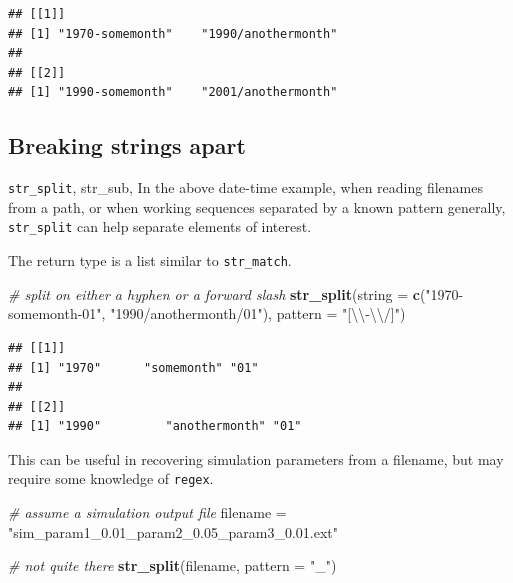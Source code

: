 \documentclass[]{book}
\newenvironment{Shaded}{}{}
\newcommand{\CharTok}[1]{\textcolor[rgb]{0.25,0.44,0.63}{#1}}
\newcommand{\CommentTok}[1]{\textcolor[rgb]{0.38,0.63,0.69}{\textit{#1}}}
\newcommand{\DataTypeTok}[1]{\textcolor[rgb]{0.56,0.13,0.00}{#1}}
\newcommand{\KeywordTok}[1]{\textcolor[rgb]{0.00,0.44,0.13}{\textbf{#1}}}
\newcommand{\NormalTok}[1]{#1}
\newcommand{\StringTok}[1]{\textcolor[rgb]{0.25,0.44,0.63}{#1}}
\begin{document}
\begin{verbatim}
## [[1]]
## [1] "1970-somemonth"    "1990/anothermonth"
## 
## [[2]]
## [1] "1990-somemonth"    "2001/anothermonth"
\end{verbatim}

\hypertarget{breaking-strings-apart}{%
\subsection{Breaking strings apart}\label{breaking-strings-apart}}

\texttt{str\_split}, str\_sub,
In the above date-time example, when reading filenames from a path, or when working sequences separated by a known pattern generally, \texttt{str\_split} can help separate elements of interest.

The return type is a list similar to \texttt{str\_match}.

\begin{Shaded}
\begin{Highlighting}[]
\CommentTok{# split on either a hyphen or a forward slash}
\KeywordTok{str_split}\NormalTok{(}\DataTypeTok{string =} \KeywordTok{c}\NormalTok{(}\StringTok{"1970-somemonth-01"}\NormalTok{,}
            \StringTok{"1990/anothermonth/01"}\NormalTok{), }
          \DataTypeTok{pattern =} \StringTok{"[}\CharTok{\textbackslash{}\textbackslash{}}\StringTok{-}\CharTok{\textbackslash{}\textbackslash{}}\StringTok{/]"}\NormalTok{)}
\end{Highlighting}
\end{Shaded}

\begin{verbatim}
## [[1]]
## [1] "1970"      "somemonth" "01"       
## 
## [[2]]
## [1] "1990"         "anothermonth" "01"
\end{verbatim}

This can be useful in recovering simulation parameters from a filename, but may require some knowledge of \texttt{regex}.

\begin{Shaded}
\begin{Highlighting}[]
\CommentTok{# assume a simulation output file}
\NormalTok{filename =}\StringTok{ "sim_param1_0.01_param2_0.05_param3_0.01.ext"}

\CommentTok{# not quite there}
\KeywordTok{str_split}\NormalTok{(filename, }\DataTypeTok{pattern =} \StringTok{"_"}\NormalTok{)}
\end{Highlighting}
\end{Shaded}
\end{document}
